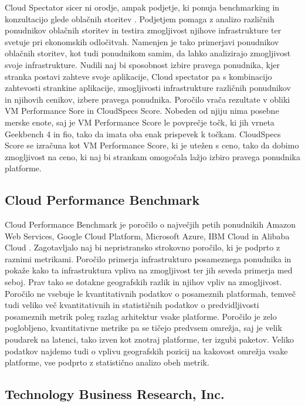 Cloud Spectator sicer ni orodje, ampak podjetje, ki ponuja benchmarking in konzultacijo glede oblačnih storitev \cite{cloudSpectator}. Podjetjem pomaga z analizo različnih ponudnikov oblačnih storitev in testira zmogljivost njihove infrastrukture ter svetuje pri ekonomskih odločitvah. Namenjen je tako primerjavi ponudnikov oblačnih storitev, kot tudi ponudnikom samim, da lahko analizirajo zmogljivost svoje infrastrukture. Nudili naj bi sposobnost izbire pravega ponudnika, kjer stranka postavi zahteve svoje aplikacije, Cloud spectator pa s kombinacijo zahtevosti strankine aplikacije, zmogljivosti infrastrukture različnih ponudnikov in njihovih cenikov, izbere pravega ponudnika.
Poročilo vrača rezultate v obliki VM Performance Sore in CloudSpecs Score. Nobeden od njiju nima posebne merske enote, saj je VM Performance Score le povprečje točk, ki jih vrneta Geekbench 4 in fio, tako da imata oba enak prispevek k točkam. CloudSpecs Score se izračuna kot VM Performance Score, ki je utežen s ceno, tako da dobimo zmogljivost na ceno, ki naj bi strankam omogočala lažjo izbiro pravega ponudnika platforme.

\subsection{Cloud Performance Benchmark}

Cloud Performance Benchmark je poročilo o največjih petih ponudnikih Amazon Web Services, Google Cloud Platform, Microsoft Azure, IBM Cloud in Alibaba Cloud \cite{thousandEyes}. Zagotavljalo naj bi nepristransko strokovno poročilo, ki je podprto z raznimi metrikami. Poročilo primerja infrastrukturo posameznega ponudnika in pokaže kako ta infrastruktura vpliva na zmogljivost ter jih seveda primerja med seboj. Prav tako se dotakne geografskih razlik in njihov vpliv na zmogljivost.
Poročilo ne vsebuje le kvantitativnih podatkov o posameznih platformah, temveč tudi veliko več kvantitativnih in statističnih podatkov o predvidljivosti posameznih metrik poleg razlag arhitektur vsake platforme. Poročilo je zelo poglobljeno, kvantitativne metrike pa se tičejo predvsem omrežja, saj je velik poudarek na latenci, tako izven kot znotraj platforme, ter izgubi paketov. Veliko podatkov najdemo tudi o vplivu geografskih pozicij na kakovost omrežja vsake platforme, vse podprto z statistično analizo obeh metrik.

\subsection{Technology Business Research, Inc.}

